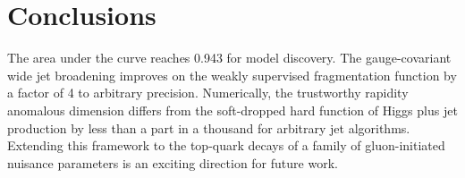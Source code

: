 \section{Conclusions}\label{sec:conclusions}

The area under the curve reaches 0.943 for model discovery. The
gauge-covariant wide jet broadening improves on the weakly supervised
fragmentation function by a factor of 4 to arbitrary precision.
Numerically, the trustworthy rapidity anomalous dimension differs from
the soft-dropped hard function of Higgs plus jet production by less than
a part in a thousand for arbitrary jet algorithms. Extending this
framework to the top-quark decays of a family of gluon-initiated
nuisance parameters is an exciting direction for future work.

